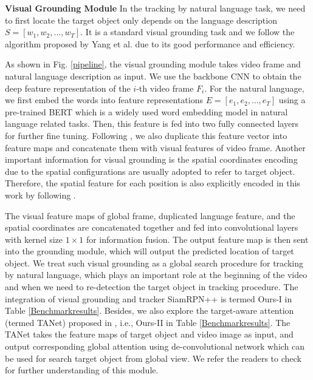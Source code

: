 \documentclass[final]{cvpr}
\begin{document}
\textbf{Visual Grounding Module}  
In the tracking by natural language task, we need to first locate the target object only depends on the language description $S = [w_1, w_2, ... , w_T]$. It is a standard visual grounding task and we follow the algorithm \cite{yang2019fastgrounding} proposed by Yang et al. due to its good performance and efficiency. 


As shown in Fig. \ref{pipeline}, the visual grounding module takes video frame and natural language description as input. We use the backbone CNN to obtain the deep feature representation of the $i$-th video frame $F_i$. For the natural language, we first embed the words into feature representations $E = [e_1, e_2, ... , e_T]$ using a pre-trained BERT \cite{devlin2019bert} which is a widely used word embedding model in natural language related tasks. Then, this feature is fed into two fully connected layers for further fine tuning. Following \cite{yang2019fastgrounding}, we also duplicate this feature vector into feature maps and concatenate them with visual features of video frame. Another important information for visual grounding is the spatial coordinates encoding due to the spatial configurations are usually adopted to refer to target object. Therefore, the spatial feature for each position is also explicitly encoded in this work by following \cite{yang2019fastgrounding}.  




The visual feature maps of global frame, duplicated language feature, and the spatial coordinates are concatenated together and fed into convolutional layers with kernel size $1 \times 1$ for information fusion. The output feature map is then sent into the grounding module, which will output the predicted location of target object. We treat such visual grounding as a global search procedure for tracking by natural language, which plays an important role at the beginning of the video and when we need to re-detection the target object in tracking procedure. The integration of visual grounding and tracker SiamRPN++ \cite{li2018siamrpn++} is termed Ours-I in Table \ref{Benchmarkresults}. Besides, we also explore the target-aware attention (termed TANet) proposed in \cite{wang2018describe, wang2019GANTrack}, i.e., Ours-II in Table \ref{Benchmarkresults}. The TANet takes the feature maps of target object and video image as input, and output corresponding global attention using de-convolutional network which can be used for search target object from global view. We refer the readers to check \cite{wang2018describe, wang2019GANTrack} for further understanding of this module. 
\end{document}
